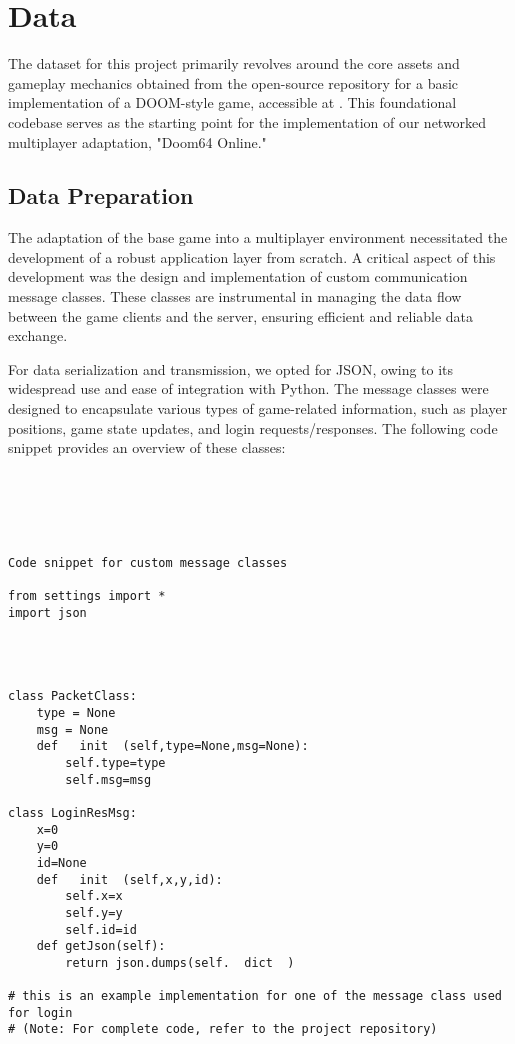 \section{Data}
\label{chap:data}

The dataset for this project primarily revolves around the core assets and gameplay mechanics obtained from the open-source repository for a basic implementation of a DOOM-style game, accessible at \cite{doom-repo}. This foundational codebase serves as the starting point for the implementation of our networked multiplayer adaptation, "Doom64 Online."

\subsection{Data Preparation}
\label{sec:data preparation}

The adaptation of the base game into a multiplayer environment necessitated the development of a robust application layer from scratch. A critical aspect of this development was the design and implementation of custom communication message classes. These classes are instrumental in managing the data flow between the game clients and the server, ensuring efficient and reliable data exchange.

For data serialization and transmission, we opted for JSON, owing to its widespread use and ease of integration with Python. The message classes were designed to encapsulate various types of game-related information, such as player positions, game state updates, and login requests/responses. The following code snippet provides an overview of these classes:

\begin{lstlisting}[style=pythonstyle]





Code snippet for custom message classes

from settings import *
import json




class PacketClass:
    type = None
    msg = None
    def   init  (self,type=None,msg=None):
        self.type=type
        self.msg=msg

class LoginResMsg:
	x=0
	y=0
	id=None
	def   init  (self,x,y,id):
		self.x=x
		self.y=y
		self.id=id
	def getJson(self):
		return json.dumps(self.  dict  )

# this is an example implementation for one of the message class used for login
# (Note: For complete code, refer to the project repository)

\end{lstlisting}

